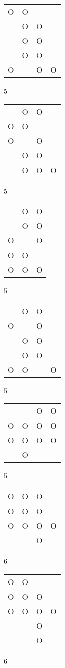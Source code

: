 \begin{tabular}{|m{0.2cm}m{0.2cm}m{0.2cm}m{0.2cm}|}\hline
O&O& & \\
 &O&O& \\
 &O&O& \\
 &O&O& \\
O& &O&O\\
\hline\end{tabular}5
\begin{tabular}{|m{0.2cm}m{0.2cm}m{0.2cm}m{0.2cm}|}\hline
 &O&O& \\
O&O& & \\
O& &O& \\
 &O&O& \\
 &O&O&O\\
\hline\end{tabular}5
\begin{tabular}{|m{0.2cm}m{0.2cm}m{0.2cm}|}\hline
 &O&O\\
 &O&O\\
O& &O\\
O&O& \\
O&O&O\\
\hline\end{tabular}5
\begin{tabular}{|m{0.2cm}m{0.2cm}m{0.2cm}m{0.2cm}|}\hline
 &O&O& \\
O& &O& \\
 &O&O& \\
 &O&O& \\
O&O& &O\\
\hline\end{tabular}5
\begin{tabular}{|m{0.2cm}m{0.2cm}m{0.2cm}m{0.2cm}|}\hline
 & &O&O\\
O&O&O&O\\
O&O&O&O\\
 &O& & \\
\hline\end{tabular}5
\begin{tabular}{|m{0.2cm}m{0.2cm}m{0.2cm}m{0.2cm}|}\hline
O&O&O& \\
O&O&O& \\
O&O&O&O\\
 & &O& \\
\hline\end{tabular}6
\begin{tabular}{|m{0.2cm}m{0.2cm}m{0.2cm}m{0.2cm}|}\hline
O&O& & \\
O&O&O& \\
O&O&O&O\\
 & &O& \\
 & &O& \\
\hline\end{tabular}6
